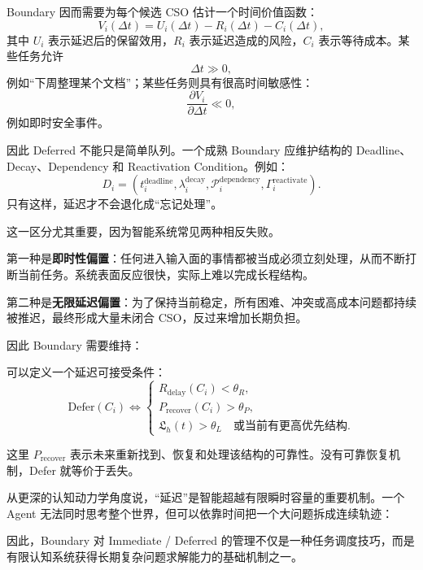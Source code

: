 Boundary 因而需要为每个候选 CSO 估计一个时间价值函数：
\[
V_i(\Delta t)
=
U_i(\Delta t)
-
R_i(\Delta t)
-
C_i(\Delta t),
\]
其中 $U_i$ 表示延迟后的保留效用，$R_i$ 表示延迟造成的风险，$C_i$ 表示等待成本。某些任务允许
\[
\Delta t\gg0,
\]
例如“下周整理某个文档”；某些任务则具有很高时间敏感性：
\[
\frac{\partial V_i}{\partial \Delta t}
\ll0,
\]
例如即时安全事件。

因此 Deferred 不能只是简单队列。一个成熟 Boundary 应维护结构的 Deadline、Decay、Dependency 和 Reactivation Condition。例如：
\[
D_i
=
(
t_i^{\mathrm{deadline}},
\lambda_i^{\mathrm{decay}},
\mathcal{P}_i^{\mathrm{dependency}},
\Gamma_i^{\mathrm{reactivate}}
).
\]
只有这样，延迟才不会退化成“忘记处理”。

这一区分尤其重要，因为智能系统常见两种相反失败。

第一种是\textbf{即时性偏置}：任何进入输入面的事情都被当成必须立刻处理，从而不断打断当前任务。系统表面反应很快，实际上难以完成长程结构。

第二种是\textbf{无限延迟偏置}：为了保持当前稳定，所有困难、冲突或高成本问题都持续被推迟，最终形成大量未闭合 CSO，反过来增加长期负担。

因此 Boundary 需要维持：
\begin{statementbox}
\centering
{}
\end{statementbox}

可以定义一个延迟可接受条件：
\[
\mathrm{Defer}(C_i)
\iff
\begin{cases}
R_{\mathrm{delay}}(C_i)<\theta_R,\\
P_{\mathrm{recover}}(C_i)>\theta_P,\\
\mathfrak{L}_h(t)>\theta_L
\quad \text{或当前有更高优先结构}.
\end{cases}
\]

这里 $P_{\mathrm{recover}}$ 表示未来重新找到、恢复和处理该结构的可靠性。没有可靠恢复机制，Defer 就等价于丢失。

从更深的认知动力学角度说，“延迟”是智能超越有限瞬时容量的重要机制。一个 Agent 无法同时思考整个世界，但可以依靠时间把一个大问题拆成连续轨迹：
\begin{statementbox}
\centering
{}
\end{statementbox}

因此，Boundary 对 Immediate / Deferred 的管理不仅是一种任务调度技巧，而是有限认知系统获得长期复杂问题求解能力的基础机制之一。


